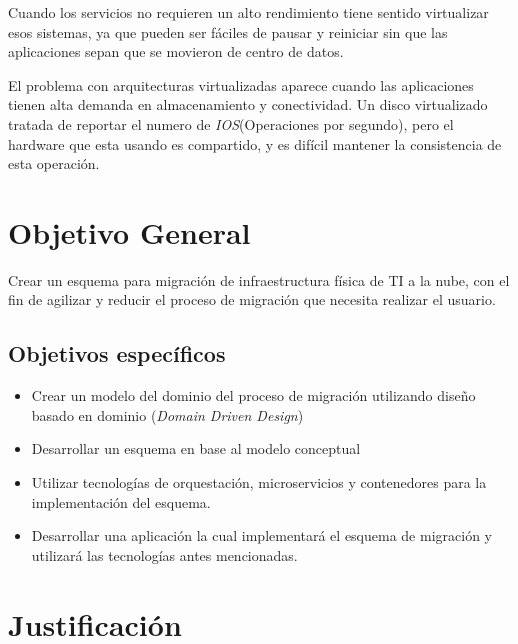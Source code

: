 \documentclass[12pt,twoside]{reedthesis}
\begin{document}
Cuando los servicios no requieren un alto rendimiento tiene sentido virtualizar esos sistemas, ya que pueden ser fáciles de pausar y reiniciar sin que las aplicaciones sepan que se movieron de centro de datos.

El problema con arquitecturas virtualizadas aparece cuando las aplicaciones tienen alta demanda en almacenamiento y conectividad. Un disco virtualizado tratada de reportar el numero de \emph{IOS}(Operaciones por segundo), pero el hardware que esta usando es compartido, y es difícil mantener la consistencia de esta operación.

\hypertarget{objetivo-general}{%
\section{Objetivo General}\label{objetivo-general}}

Crear un esquema para migración de infraestructura física de TI a la nube, con el fin de agilizar y reducir el proceso de migración que necesita realizar el usuario.

\hypertarget{objetivos-especificos}{%
\subsection{Objetivos específicos}\label{objetivos-especificos}}
\begin{itemize}
\item
  Crear un modelo del dominio del proceso de migración utilizando diseño basado en dominio (\emph{Domain Driven Design})
\item
  Desarrollar un esquema en base al modelo conceptual
\item
  Utilizar tecnologías de orquestación, microservicios y contenedores para la implementación del esquema.
\item
  Desarrollar una aplicación la cual implementará el esquema de migración y utilizará las tecnologías antes mencionadas.
\end{itemize}
\hypertarget{justificacion}{%
\section{Justificación}\label{justificacion}}
\end{document}
